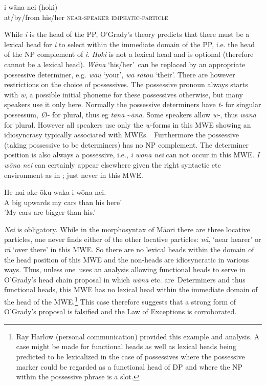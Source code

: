\documentclass[output=paper]{langsci/langscibook}
\begin{document}
\begin{exe}
\ex\label{ex:ex29} 
\gll i     w\=ana       nei         (hoki)\\
  at/by/from   his/her     \textsc{near-speaker} \textsc{emphatic-particle}\\
\end{exe}



While \textit{i} is the head of the PP, O’Grady’s theory predicts that there must be a lexical head for \textit{i} to select within the immediate domain of the PP, i.e. the head of the NP complement of \textit{i}. \textit{Hoki} is not a lexical head and is optional (therefore cannot be a lexical head).  \textit{W\=ana} ‘his/her’~can be replaced by an appropriate possessive determiner, e.g. \textit{w\=au} ‘your’, \textit{w\=a r\=atou} ‘their’. There are however restrictions on the choice of possessives. The possessive pronoun always starts with \textit{w}, a possible initial phoneme for these possessives otherwise, but many speakers use it only here. Normally the possessive determiners have \textit{t-} for singular possessum,~Ø- for plural, thus eg \textit{t\=ana} {\textasciitilde}\textit{\=ana}. Some speakers allow \textit{w-}, thus \textit{w\=ana} for plural. However all speakers use only the \textit{w-}forms in this MWE showing an idiosyncrasy typically associated with MWEs.~ Furthermore the possessive (taking possessive to be determiners) has no NP complement. The determiner position is also always a possessive, i.e., \textit{i w\=ona nei} 
can not occur in this MWE. \textit{I w\=ona nei} can certainly appear elsewhere given the right syntactic etc environment as in ; just never in this MWE.

\ea\label{ex:ex30}
\gll He nui ake     \=oku waka i    w\=ona nei.\\
                    A  big upwards my    cars than his    here'\\
\glt 'My cars are bigger than his.'
\z


\textit{Nei} is obligatory. While in the morphosyntax of M\=aori  there are three locative particles, one never finds either of the other locative particles: \textit{n\=a}, ‘near hearer’ or \textit{r\=a} ‘over there’ in this MWE. So there are no lexical heads within the domain of the head position of this MWE and the non-heads are idiosyncratic in various ways. 
Thus, unless one~uses an analysis allowing functional heads to serve in O’Grady’s head chain proposal in which \textit{w\=ana} etc. are~Determiners and thus functional heads, this MWE has no lexical head within the immediate domain of the head of the MWE.\footnote{Ray Harlow (personal communication) provided this example and analysis. A case might be made for functional heads as well as lexical heads being predicted to be lexicalized in the case of possessives where the possessive marker could be regarded as a functional head of DP and where the NP within the possessive phrase is a slot.} 
This case therefore suggests that a strong form of O’Grady’s proposal is falsified and the Law of Exceptions is corroborated. 
\end{document}
